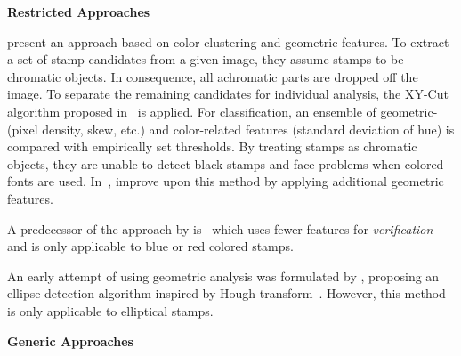 {\bfseries{}Restricted Approaches}
    \begin{description}[font={\color{red!50!black}\ttfamily}]
        \item[Color restricted]
                \Textcite{Micenkova.2011} present an approach based on color
                clustering and geometric features. To extract a set of
                stamp-candidates from a given image, they assume stamps to
                be chromatic objects. In consequence, all achromatic parts
                are dropped off the image. To separate the remaining candidates
                for individual analysis, the XY-Cut algorithm proposed
                in~\cite{Krishnamoorthy.1993} is applied. For classification,
                an ensemble of geometric- (pixel density, skew, etc.) and
                color-related features (standard deviation of hue) is compared
                with empirically set thresholds. By treating stamps as
                chromatic objects, they are unable to detect black stamps
                and face problems when colored fonts are used.                
                In~\cite{Micenkova.2015}, \citeauthor*{Micenkova.2015} improve
                upon this method by applying additional geometric features.
                
                A predecessor of the approach by \textcite{Micenkova.2011}
                is~\cite{Forczmanski.2010} which uses fewer features for
                \textit{verification} and is only applicable to blue or red
                colored stamps.
            \item[Geometrically restricted]
                An early attempt of using geometric analysis was formulated by
                \textcite{Zhu.2006}, proposing an ellipse detection algorithm
                inspired by Hough transform~\cite{Duda.1972}. However, this method
                is only applicable to elliptical stamps.
    \end{description}
\bigskip{}
{\bfseries{}Generic Approaches}

